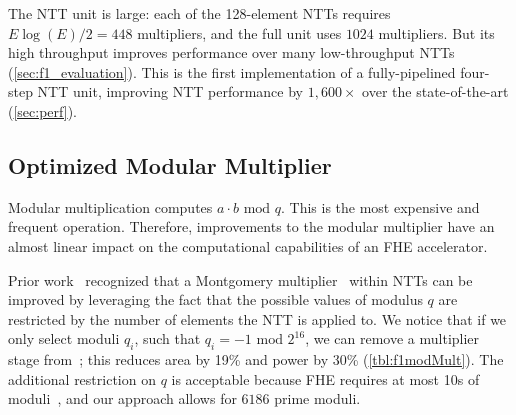 The NTT unit is large: each of the 128-element NTTs requires $E \log
(E)/2=448$ multipliers, and the full unit uses $1024$ multipliers. But its
high throughput improves performance over many low-throughput NTTs
(\autoref{sec:f1_evaluation}). This is the first implementation of a
fully-pipelined four-step NTT unit, improving NTT performance by $1,600\times$
over the state-of-the-art (\autoref{sec:perf}).


\subsection{Optimized Modular Multiplier}\label{sec:modMult}
\tblFOneModMult

Modular multiplication computes $a\cdot b \textrm{ mod } q$. This is the most
expensive and frequent operation. Therefore, improvements to the modular
multiplier have an almost linear impact on the computational capabilities of an
FHE accelerator.

Prior work~\cite{mert:euromicro19:design} recognized that a Montgomery
multiplier~\cite{montgomery:mom85:modular} within NTTs can be improved by
leveraging the fact that the possible values of modulus $q$ are restricted by
the number of elements the NTT is applied to. We notice that if we only select
moduli $q_i$, such that $q_i = -1 \textrm{ mod } 2^{16}$, we can remove a
multiplier stage from~\cite{mert:euromicro19:design}; this reduces area by 19\%
and power by 30\% (\autoref{tbl:f1modMult}). The additional restriction on $q$
is acceptable because FHE requires at most 10s of
moduli~\cite{gentry:crypto2012:homomorphic}, and our approach allows for
$6186$ prime moduli.
